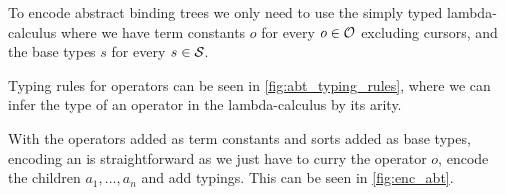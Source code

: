 \documentclass[sigplan,screen]{acmart}
\begin{document}
To encode abstract binding trees we only need to use the simply typed
lambda-calculus where we have term constants $o$ for every $o \in \mathcal{O}$
excluding cursors, and the base types $s$ for every $s \in \mathcal{S}$.

Typing rules for operators can be seen in \cref{fig:abt_typing_rules},
where we can infer the type of an operator in the lambda-calculus by
its arity.

With the operators added as term constants and sorts added as base
types, encoding an {\abt} is straightforward as we just have to curry the
operator $o$, encode the children $a_1, \dots, a_n$ and add
typings. This can be seen in \cref{fig:enc_abt}.

\end{document}
